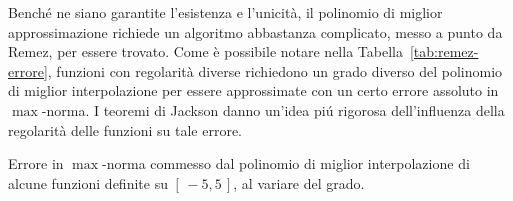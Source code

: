  	Benché ne siano garantite l'esistenza e l'unicità, il polinomio di miglior approssimazione richiede un algoritmo abbastanza complicato, messo a punto da Remez, per essere trovato. Come è possibile notare nella Tabella~\ref{tab:remez-errore}, funzioni con regolarità diverse richiedono un grado diverso del polinomio di miglior interpolazione per essere approssimate con un certo errore assoluto in \(\max\)-norma. I teoremi di Jackson danno un'idea piú rigorosa dell'influenza della regolarità delle funzioni su tale errore.
 	
 	\begin{table}[tpb]
 		\centering
 		
 		\caption{Errore in \(\max\)-norma commesso dal polinomio di miglior interpolazione di alcune funzioni definite su \([\, -5, 5 \,]\), al variare del grado.}\label{tab:remez-errore}
 		

\end{table}

